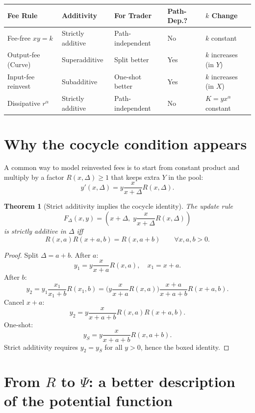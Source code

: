 \documentclass[11pt]{article}
\newtheorem{theorem}{Theorem}[section]
\theoremstyle{definition}
\theoremstyle{remark}
\begin{document}
\begin{center}
\begin{tabular}{@{}lllll@{}}
\toprule
\textbf{Fee Rule} & \textbf{Additivity} & \textbf{For Trader} & \textbf{Path-Dep.?} & \textbf{$k$ Change} \\
\midrule
Fee-free $xy=k$ & Strictly additive & Path-independent & No & $k$ constant \\
Output-fee (Curve) & Superadditive & Split better & Yes & $k$ increases (in $Y$) \\
Input-fee reinvest & Subadditive & One-shot better & Yes & $k$ increases (in $X$) \\
Dissipative $r^\alpha$ & Strictly additive & Path-independent & No & $K=y x^\alpha$ constant \\
\bottomrule
\end{tabular}
\end{center}

\section{Why the cocycle condition appears}\label{sec:cocycle}

A common way to model reinvested fees is to start from constant product and multiply by a factor $R(x,\Delta)\ge 1$ that keeps extra $Y$ in the pool:
\[
 y'(x,\Delta) = y\frac{x}{x+\Delta}R(x,\Delta).
\]

\begin{theorem}[Strict additivity implies the cocycle identity]
The update rule
\[
F_\Delta(x,y)=\left(x+\Delta,\; y\frac{x}{x+\Delta}R(x,\Delta)\right)
\]
is strictly additive in $\Delta$ iff
\[
\boxed{R(x,a)R(x+a,b)=R(x,a+b)}\qquad\forall x,a,b>0.
\]
\end{theorem}

\begin{proof}
Split $\Delta=a+b$.
After $a$:
\[
 y_1 = y\frac{x}{x+a}R(x,a),\quad x_1=x+a.
\]
After $b$:
\[
 y_2 = y_1\frac{x_1}{x_1+b}R(x_1,b)
     = \Big(y\frac{x}{x+a}R(x,a)\Big)\frac{x+a}{x+a+b}R(x+a,b).
\]
Cancel $x+a$:
\[
 y_2 = y\frac{x}{x+a+b}R(x,a)R(x+a,b).
\]
One-shot:
\[
 y_S = y\frac{x}{x+a+b}R(x,a+b).
\]
Strict additivity requires $y_2=y_S$ for all $y>0$, hence the boxed identity.
\end{proof}

\section{From $R$ to $\Psi$: a better description of the potential function}\label{sec:psi}
\end{document}
